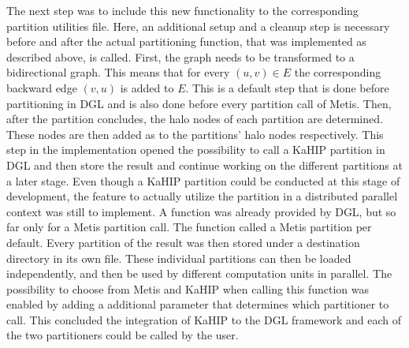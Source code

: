 \documentclass[acmsmall,nonacm,screen,review]{acmart}
\begin{document}
The next step was to include this new functionality to the corresponding partition utilities file. Here, an additional setup and a cleanup step is necessary before and after the actual partitioning function, that was implemented as described above, is called. First, the graph needs to be transformed to a bidirectional graph. This means that for every $(u,v) \in E$ the corresponding backward edge $(v,u)$ is added to $E$. This is a default step that is done before partitioning in DGL and is also done before every partition call of Metis. Then, after the partition concludes, the halo nodes of each partition are determined. These nodes are then added as to the partitions' halo nodes respectively. This step in the implementation opened the possibility to call a KaHIP partition in DGL and then store the result and continue working on the different partitions at a later stage.
Even though a KaHIP partition could be conducted at this stage of development, the feature to actually utilize the partition in a distributed parallel context was still to implement. A function was already provided by DGL, but so far only for a Metis partition call. The function called a Metis partition per default. Every partition of the result was then stored under a destination directory in its own file. These individual partitions can then be loaded independently, and then be used by different computation units in parallel. The possibility to choose from Metis and KaHIP when calling this function was enabled by adding a additional parameter that determines which partitioner to call. This concluded the integration of KaHIP to the DGL framework and each of the two partitioners could be called by the user. \\
\end{document}
